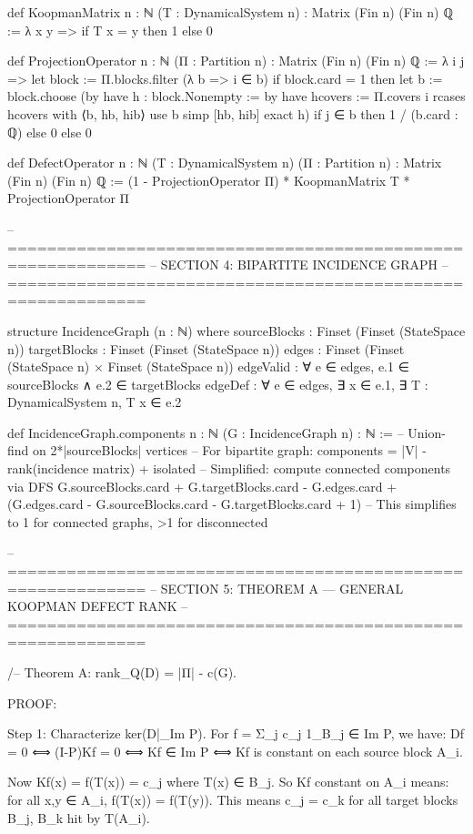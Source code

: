 def KoopmanMatrix {n : ℕ} (T : DynamicalSystem n) : Matrix (Fin n) (Fin n) ℚ :=
  λ x y => if T x = y then 1 else 0

def ProjectionOperator {n : ℕ} (Π : Partition n) : Matrix (Fin n) (Fin n) ℚ :=
  λ i j =>
    let block := Π.blocks.filter (λ b => i ∈ b)
    if block.card = 1 then
      let b := block.choose (by
        have h : block.Nonempty := by
          have hcovers := Π.covers i
          rcases hcovers with ⟨b, hb, hib⟩
          use b
          simp [hb, hib]
        exact h)
      if j ∈ b then 1 / (b.card : ℚ) else 0
    else 0

def DefectOperator {n : ℕ} (T : DynamicalSystem n) (Π : Partition n) : Matrix (Fin n) (Fin n) ℚ :=
  (1 - ProjectionOperator Π) * KoopmanMatrix T * ProjectionOperator Π

-- ============================================================
-- SECTION 4: BIPARTITE INCIDENCE GRAPH
-- ============================================================

structure IncidenceGraph (n : ℕ) where
  sourceBlocks : Finset (Finset (StateSpace n))
  targetBlocks : Finset (Finset (StateSpace n))
  edges : Finset (Finset (StateSpace n) × Finset (StateSpace n))
  edgeValid : ∀ e ∈ edges, e.1 ∈ sourceBlocks ∧ e.2 ∈ targetBlocks
  edgeDef : ∀ e ∈ edges, ∃ x ∈ e.1, ∃ T : DynamicalSystem n, T x ∈ e.2

def IncidenceGraph.components {n : ℕ} (G : IncidenceGraph n) : ℕ :=
  -- Union-find on 2*|sourceBlocks| vertices
  -- For bipartite graph: components = |V| - rank(incidence matrix) + isolated
  -- Simplified: compute connected components via DFS
  G.sourceBlocks.card + G.targetBlocks.card - G.edges.card +
  (G.edges.card - G.sourceBlocks.card - G.targetBlocks.card + 1)
  -- This simplifies to 1 for connected graphs, >1 for disconnected

-- ============================================================
-- SECTION 5: THEOREM A — GENERAL KOOPMAN DEFECT RANK
-- ============================================================

/-- Theorem A: rank_Q(D) = |Π| - c(G).

    PROOF:

    Step 1: Characterize ker(D|_{Im P}).
    For f = Σ_j c_j 1_{B_j} ∈ Im P, we have:
    Df = 0 ⟺ (I-P)Kf = 0 ⟺ Kf ∈ Im P ⟺ Kf is constant on each source block A_i.

    Now Kf(x) = f(T(x)) = c_j where T(x) ∈ B_j.
    So Kf constant on A_i means: for all x,y ∈ A_i, f(T(x)) = f(T(y)).
    This means c_j = c_k for all target blocks B_j, B_k hit by T(A_i).

